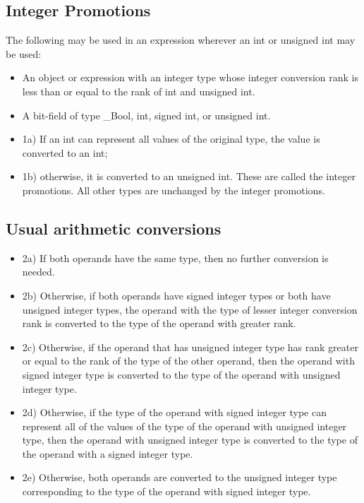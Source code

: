 \documentclass{article}
\begin{document}
\subsection{Integer Promotions}
    The following may be used in an expression wherever an int or unsigned int may
    be used:
    \begin{itemize}[noitemsep]
        \item An object or expression with an integer type whose integer conversion rank is less
        than or equal to the rank of int and unsigned int.
        \item A bit-field of type \_Bool, int, signed int, or unsigned int.
    \end{itemize}
\begin{itemize}[noitemsep]
    \item 1a) If an int can represent all values of the original type, the value is converted to an int;
    \item 1b) otherwise, it is converted to an unsigned int.
    These are called the integer promotions. All other types are unchanged by the integer promotions.
\end{itemize}

\subsection{Usual arithmetic conversions}
\begin{itemize}[noitemsep]
    \item 2a) If both operands have the same type, then no further conversion is needed.

    \item 2b) Otherwise, if both operands have signed integer types or both have unsigned
    integer types, the operand with the type of lesser integer conversion rank is
    converted to the type of the operand with greater rank.

    \item 2c) Otherwise, if the operand that has unsigned integer type has rank greater or
    equal to the rank of the type of the other operand, then the operand with
    signed integer type is converted to the type of the operand with unsigned
    integer type.

    \item 2d) Otherwise, if the type of the operand with signed integer type can represent
    all of the values of the type of the operand with unsigned integer type, then
    the operand with unsigned integer type is converted to the type of the
    operand with a signed integer type.

    \item 2e) Otherwise, both operands are converted to the unsigned integer type
    corresponding to the type of the operand with signed integer type.
\end{itemize}
\end{document}
